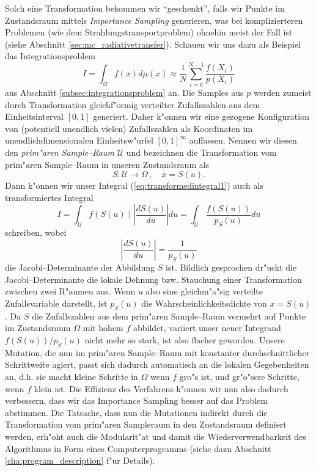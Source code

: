	Solch eine Transformation bekommen wir ``geschenkt'', falls wir Punkte im Zustandsraum mittels {\em Importance Sampling} generieren, was bei komplizierteren Problemen (wie dem Strahlungstransportproblem) ohnehin meist der Fall ist (siehe Abschnitt \ref{sec:mc_radiativetransfer}). Schauen wir uns dazu als Beispiel das Integrationsproblem
	\begin{equation}
		I=\int_\Omega f(x) d\mu(x)\approx \frac{1}{N}\sum_{i=0}^{N-1} \frac{f(X_i)}{p(X_i)}
		\label{eq:transformedintegral1}
	\end{equation}
	aus Abschnitt \ref{subsec:integrationsproblem} an. Die Samples aus $p$ werden zumeist durch Transformation gleichf"ormig verteilter Zufallszahlen aus dem Einheitsinterval $[0,1]$ generiert. Daher k"onnen wir eine gezogene Konfiguration von (potentiell unendlich vielen) Zufallszahlen als Koordinaten im unendlichdimensionalen Einheitsw"urfel $[0,1]^\infty$ auffassen. Nennen wir diesen den {\em prim"aren Sample--Raum} $\mathcal{U}$ und bezeichnen die Transformation vom prim"aren Sample--Raum in unseren Zustandsraum als
	$$S : \mathcal{U} \to \Omega\,,\quad x=S(u).$$
	Dann k"onnen wir unser Integral (\ref{eq:transformedintegral1}) auch als transformiertes Integral
	$$I=\int_\mathcal{U} f(S(u)) \left|\frac{dS(u)}{du}\right|du=\int_\mathcal{U} \frac{f(S(u))}{p_S(u)}du$$
	schreiben, wobei
	$$\left|\frac{dS(u)}{du}\right|=\frac{1}{p_S(u)}$$
	die Jacobi--Determinante der Abbildung $S$ ist. Bildlich gesprochen dr"uckt die Jacobi--Determinante die lokale Dehnung bzw. Stauchung einer Transformation zwischen zwei R"aumen aus. Wenn $u$ also eine gleichm"a"sig verteilte Zufallsvariable darstellt, ist $p_S(u)$ die Wahrscheinlichkeitsdichte von $x=S(u)$. Da $S$ die Zufallszahlen aus dem prim"aren Sample--Raum vermehrt auf Punkte im Zustandsraum $\Omega$ mit hohem $f$ abbildet, variiert unser neuer Integrand $f(S(u))/p_S(u)$ nicht mehr so stark, ist also flacher geworden. Unsere Mutation, die nun im prim"aren Sample--Raum mit konstanter durchschnittlicher Schrittweite agiert, passt sich dadurch automatisch an die lokalen Gegebenheiten an, d.h. sie macht kleine Schritte in $\Omega$ wenn $f$ gro"s ist, und gr"o"sere Schritte, wenn $f$ klein ist. Die Effizienz des Verfahrens k"onnen wir nun also dadurch verbessern, dass wir das Importance Sampling besser auf das Problem abstimmen. Die Tatsache, dass nun die Mutationen indirekt durch die Transformation vom prim"aren Sampleraum in den Zustandsraum definiert werden, erh"oht auch die Modularit"at und damit die Wiederverwendbarkeit des Algorithmus in Form eines Computerprogramms (siehe dazu Abschnitt \ref{cha:program_description} f"ur Details).

